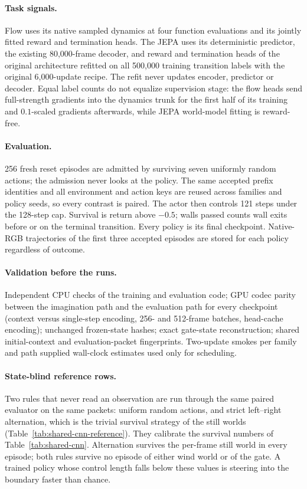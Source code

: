 \paragraph{Task signals.}
Flow uses its native sampled dynamics at four function evaluations and its jointly fitted reward
and termination heads. The JEPA uses its deterministic predictor, the existing 80,000-frame
decoder, and reward and termination heads of the original architecture refitted on all 500,000
training transition labels with the original 6,000-update recipe. The refit never updates encoder,
predictor or decoder. Equal label counts do not equalize supervision stage: the flow heads send
full-strength gradients into the dynamics trunk for the first half of its training and
$0.1$-scaled gradients afterwards, while JEPA world-model fitting is reward-free.

\paragraph{Evaluation.}
256 fresh reset episodes are admitted by surviving seven uniformly random actions; the admission
never looks at the policy. The same accepted prefix identities and all environment and action keys
are reused across families and policy seeds, so every contrast is paired. The actor then controls
121 steps under the 128-step cap. Survival is return above $-0.5$; walls passed counts wall exits
before or on the terminal transition. Every policy is its final checkpoint. Native-RGB trajectories
of the first three accepted episodes are stored for each policy regardless of outcome.

\paragraph{Validation before the runs.}
Independent CPU checks of the training and evaluation code; GPU codec parity between the
imagination path and the evaluation path for every checkpoint (context versus single-step
encoding, 256- and 512-frame batches, head-cache encoding); unchanged frozen-state hashes; exact
gate-state reconstruction; shared initial-context and evaluation-packet fingerprints. Two-update
smokes per family and path supplied wall-clock estimates used only for scheduling.

\paragraph{State-blind reference rows.}
Two rules that never read an observation are run through the same paired evaluator on the same
packets: uniform random actions, and strict left--right alternation, which is the trivial survival
strategy of the still worlds (Table~\ref{tab:shared-cnn-reference}). They calibrate the survival
numbers of Table~\ref{tab:shared-cnn}. Alternation survives the per-frame still world in every
episode; both rules survive no episode of either wind world or of the gate. A trained policy whose
control length falls below these values is steering into the boundary faster than chance.

